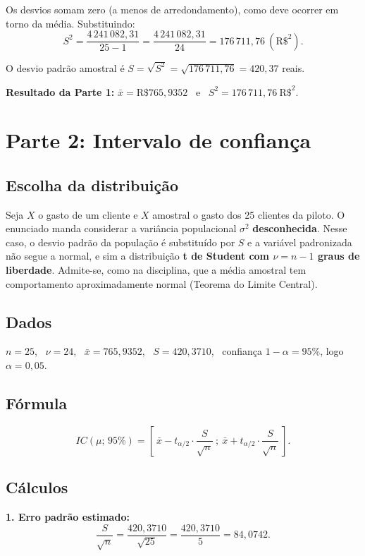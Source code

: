 \documentclass[12pt,a4paper]{article}
\newcommand{\xb}{\bar{x}}
\begin{document}
Os desvios somam zero (a menos de arredondamento), como deve ocorrer em torno da média. Substituindo:
$$S^2 = \frac{4\,241\,082{,}31}{25-1} = \frac{4\,241\,082{,}31}{24} = 176\,711{,}76 \ (\text{R\$}^2).$$

O desvio padrão amostral é $S = \sqrt{S^2} = \sqrt{176\,711{,}76} = 420{,}37$ reais.

\textbf{Resultado da Parte 1:} $\xb = \text{R\$ } 765{,}9352$ \ e \ $S^2 = 176\,711{,}76\ \text{R\$}^2$.

\section{Parte 2: Intervalo de confiança}

\subsection*{Escolha da distribuição}

Seja $X$ o gasto de um cliente e $X$ amostral o gasto dos 25 clientes da piloto. O enunciado manda considerar a variância populacional $\sigma^2$ \textbf{desconhecida}. Nesse caso, o desvio padrão da população é substituído por $S$ e a variável padronizada não segue a normal, e sim a distribuição \textbf{t de Student com $\nu = n-1$ graus de liberdade}. Admite-se, como na disciplina, que a média amostral tem comportamento aproximadamente normal (Teorema do Limite Central).

\subsection*{Dados}

$n = 25$, \ $\nu = 24$, \ $\xb = 765{,}9352$, \ $S = 420{,}3710$, \ confiança $1-\alpha = 95\%$, logo $\alpha = 0{,}05$.

\subsection*{Fórmula}

$$IC(\mu;\,95\%) = \left[\ \xb - t_{\alpha/2}\cdot\frac{S}{\sqrt{n}}\ ;\ \xb + t_{\alpha/2}\cdot\frac{S}{\sqrt{n}}\ \right].$$

\subsection*{Cálculos}

\textbf{1. Erro padrão estimado:}
$$\frac{S}{\sqrt{n}} = \frac{420{,}3710}{\sqrt{25}} = \frac{420{,}3710}{5} = 84{,}0742.$$
\end{document}
